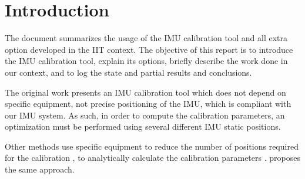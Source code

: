 \section{Introduction}\label{sec:intro}

The document summarizes the usage of the IMU calibration tool and all extra option developed in the IIT context.
%
The objective of this report is to introduce the IMU calibration tool, explain its options, briefly describe the work done in our context, and to log the state and partial results and conclusions.

The original work \cite{2014:Tedaldi} presents an IMU calibration tool which does not depend on specific equipment, not precise positioning of the IMU, which is compliant with our IMU system.
%
As such, in order to compute the calibration parameters, an optimization must be performed using several different IMU static positions.

Other methods use specific equipment to reduce the number of positions required for the calibration \cite{lv2016method}, to analytically calculate the calibration parameters \cite{bhatia2016development}. \cite{qureshi2017algorithm} proposes the same approach.

 




